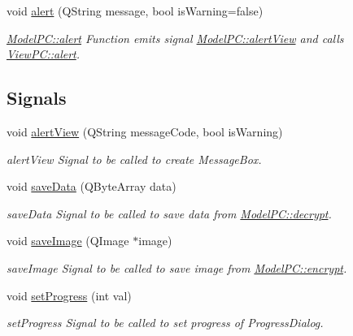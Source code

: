 \begin{DoxyCompactItemize}
void \hyperlink{class_model_p_c_a9079a101d83672aa48fd2dbac797de40}{alert} (Q\-String message, bool is\-Warning=false)
\begin{DoxyCompactList}\small\item\em \hyperlink{class_model_p_c_a9079a101d83672aa48fd2dbac797de40}{Model\-P\-C\-::alert} Function emits signal \hyperlink{class_model_p_c_af0217a7ca5671e26090dc50a5dccdaf5}{Model\-P\-C\-::alert\-View} and calls \hyperlink{class_view_p_c_a7c467169467789561078abc9d4fe57bd}{View\-P\-C\-::alert}. \end{DoxyCompactList}\end{DoxyCompactItemize}
\subsection*{Signals}
\begin{DoxyCompactItemize}
\item 
void \hyperlink{class_model_p_c_af0217a7ca5671e26090dc50a5dccdaf5}{alert\-View} (Q\-String message\-Code, bool is\-Warning)
\begin{DoxyCompactList}\small\item\em alert\-View Signal to be called to create Message\-Box. \end{DoxyCompactList}\item 
void \hyperlink{class_model_p_c_a0855107fb0ccc247cd9e893fae9bb08a}{save\-Data} (Q\-Byte\-Array data)
\begin{DoxyCompactList}\small\item\em save\-Data Signal to be called to save data from \hyperlink{class_model_p_c_a5995215a34a1e1f504035715a8013809}{Model\-P\-C\-::decrypt}. \end{DoxyCompactList}\item 
void \hyperlink{class_model_p_c_a41f5e2e8022679046e4d3fa1109025fa}{save\-Image} (Q\-Image $\ast$image)
\begin{DoxyCompactList}\small\item\em save\-Image Signal to be called to save image from \hyperlink{class_model_p_c_a6f191f62d4635d0d3555fcc0be298794}{Model\-P\-C\-::encrypt}. \end{DoxyCompactList}\item 
void \hyperlink{class_model_p_c_afdcd80f0ed5062e145a71f09b0897547}{set\-Progress} (int val)
\begin{DoxyCompactList}\small\item\em set\-Progress Signal to be called to set progress of Progress\-Dialog. \end{DoxyCompactList}\end{DoxyCompactItemize}
